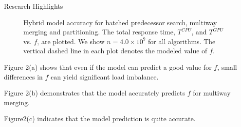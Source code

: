 \documentclass[final]{beamer}
\newlength{\colwidth}
\begin{document}
\begin{frame}[t]
\begin{columns}[t]
\begin{column}{\colwidth}
  \begin{block}{Research Highlights}
\begin{figure}[htp]
\centering
{}
 \caption{Hybrid model accuracy for batched predecessor search, multiway merging and partitioning. The total response time, $T^{CPU}$, and $T^{GPU}$ vs. $f$, are plotted. We show $n=4.0\times10^9$ for all algorithms. The vertical dashed line in each plot denotes the modeled value of $f$.}

 \label{fig:time_vs_f}
\end{figure}

\begin{description}[font=$\bullet$~\normalfont\scshape\color{red!50!black}]
\item  Figure 2(a) shows that even if the model can predict a good value for $f$, small differences in $f$ can yield significant load imbalance. 
\item Figure 2(b) demonstrates that the model accurately predicts $f$ for multiway merging.
\item  Figure2(c) indicates that the model prediction is quite accurate.
\end{description}


\end{block}
\end{column}
\end{columns}
\end{frame}
\end{document}
